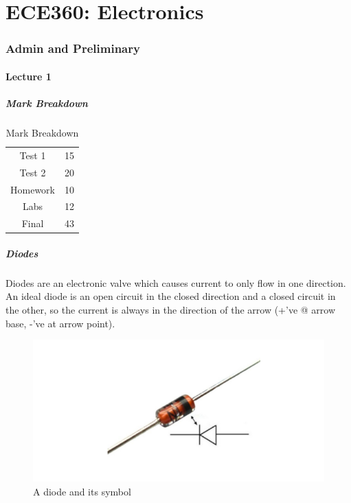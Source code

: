 \documentclass[10pt]{article}
\begin{document}
\part{ECE360: Electronics}


\section{Admin and Preliminary}

\subsection{Lecture 1}



\subsubsection{Mark Breakdown}

\begin{table}[H]
	\centering
	\caption{Mark Breakdown}
	\begin{tabular}{|c|c|}
		\hline
		Test 1 & 15 \\
		Test 2 & 20 \\
		Homework & 10 \\
		Labs & 12 \\
		Final & 43 \\
		\hline
	\end{tabular}
\end{table}

\subsubsection{Diodes}

Diodes are an electronic valve which causes current to only flow in one direction.
An ideal diode is an open circuit in the closed direction and a closed circuit in the other, so the current is always in the direction of the arrow (+'ve @ arrow base, -'ve at arrow point).


\begin{figure}[H]
	\centering
	\includegraphics[width=0.8\linewidth]{img/360_diode.png}
	\caption{A diode and its symbol}
	\label{fig:360:diode}
\end{figure}
\end{document}
